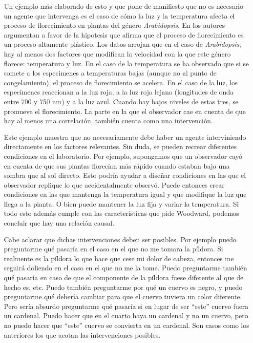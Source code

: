 Un ejemplo más elaborado de esto y que pone de manifiesto que no es necesario un agente que intervenga es el caso de cómo la luz y la temperatura afecta el proceso de florecimiento en plantas del género \emph{Arabidopsis}. En \cite{AusinEnviro} los autores argumentan a favor de la hipotesis que afirma que el proceso de florecimiento es un proceso altamente plástico. Los datos arrojan que en el caso de \emph{Arabidopsis}, hay al menos dos factores que modifican la velocidad con la que este género florece: temperatura y luz. En el caso de la temperatura se ha observado que si se somete a los especímenes a temperaturas bajas (aunque no al punto de congelamiento), el proceso de florecimiento se acelera. En el caso de la luz, los especímenes reaccionan a la luz roja, a la luz roja lejana (longitudes de onda entre 700 y 750 nm) y a la luz azul. Cuando hay bajos niveles de estas tres, se promueve el florecimiento. La parte en la que el observador cae en cuenta de que hay al menos una correlación, también cuenta como una intervención.

Este ejemplo muestra que no necesariamente debe haber un agente interviniendo directamente en los factores relevantes. Sin duda, se pueden recrear diferentes condiciones en el laboratorio. Por ejemplo, supongamos que un observador cayó en cuenta de que sus plantas florecían más rápido cuando estaban bajo una sombra que al sol directo. Esto podría ayudar a diseñar condiciones en las que el observador replique lo que accidentalmente observó. Puede entonces crear condiciones en las que mantenga la temperatura igual y que modifique la luz que llega a la planta. O bien puede mantener la luz fija y variar la temperatura. Si todo esto además cumple con las características que pide Woodward, podemos concluir que hay una relación causal.

Cabe aclarar que dichas intervenciones deben ser posibles. Por ejemplo puedo preguntarme qué pasaría en el caso en el que no me tomara la píldora. Si realmente es la píldora lo que hace que cese mi dolor de cabeza, entonces me seguirá doliendo en el caso en el que no me la tome. Puedo preguntarme también qué pasaría en caso de que el componente de la píldora fuese diferente al que de hecho es, etc. Puedo también preguntarme por qué un cuervo es negro, y puedo preguntarme qué debería cambiar para que el cuervo tuviera un color diferente. Pero sería absurdo preguntarme qué pasaría si en lugar de ser ``este'' cuervo fuera un cardenal. Puedo hacer que en el cuarto haya un cardenal y no un cuervo, pero no puedo hacer que ``este'' cuervo se convierta en un cardenal. Son casos como los anteriores los que acotan las intervenciones posibles.

